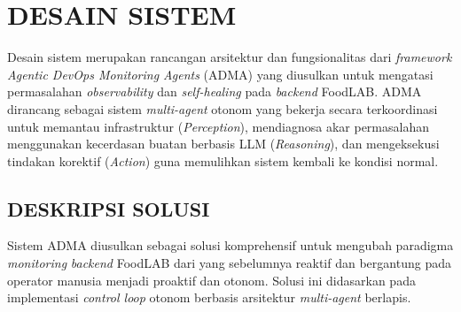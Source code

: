 \chapter{DESAIN SISTEM}

Desain sistem merupakan rancangan arsitektur dan fungsionalitas dari \textit{framework} \textit{Agentic DevOps Monitoring Agents} (ADMA) yang diusulkan untuk mengatasi permasalahan \textit{observability} dan \textit{self-healing} pada \textit{backend} FoodLAB. ADMA dirancang sebagai sistem \textit{multi-agent} otonom yang bekerja secara terkoordinasi untuk memantau infrastruktur (\textit{Perception}), mendiagnosa akar permasalahan menggunakan kecerdasan buatan berbasis LLM (\textit{Reasoning}), dan mengeksekusi tindakan korektif (\textit{Action}) guna memulihkan sistem kembali ke kondisi normal.



\section{DESKRIPSI SOLUSI}

Sistem ADMA diusulkan sebagai solusi komprehensif untuk mengubah paradigma \textit{monitoring} \textit{backend} FoodLAB dari yang sebelumnya reaktif dan bergantung pada operator manusia menjadi proaktif dan otonom. Solusi ini didasarkan pada implementasi \textit{control loop} otonom berbasis arsitektur \textit{multi-agent} berlapis.

